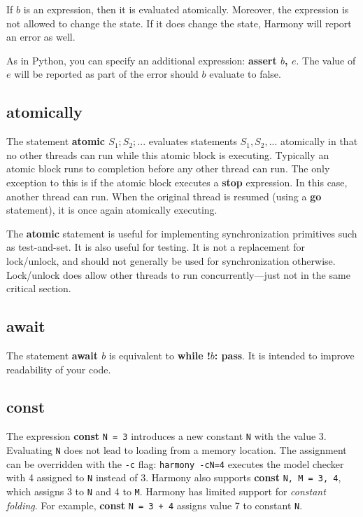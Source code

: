 \documentclass{report}
\begin{document}
If $b$ is an expression, then it is evaluated atomically.
Moreover, the expression is not allowed to change the state.
If it does change the state, Harmony will report an error as well.

As in Python, you can specify an additional expression:
\textbf{assert $b$, $e$}.  The value of $e$ will be reported as part
of the error should $b$ evaluate to false.

\subsection*{\textbf{atomically}}

The statement \textbf{atomic $S_1; S_2; ...$} evaluates statements
$S_1, S_2, ...$ atomically in that no other threads can run while
this atomic block is executing.  Typically an atomic block runs
to completion before any other thread can run.  The only exception
to this is if the atomic block executes a \textbf{stop} expression.
In this case, another thread can run.  When the original thread
is resumed (using a \textbf{go} statement), it is once again
atomically executing.

The \textbf{atomic} statement is useful for implementing synchronization
primitives such as test-and-set.  It is also useful for testing.
It is not a replacement for lock/unlock, and should not generally be used
for synchronization otherwise.  Lock/unlock does allow other
threads to run concurrently---just not in the same critical section.

\subsection*{\textbf{await}}

The statement \textbf{await $b$} is equivalent to \textbf{while !$b$: pass}.
It is intended to improve readability of your code.

\subsection*{\textbf{const}}

The expression \textbf{const} \texttt{N = 3} introduces a new constant
\texttt{N} with the value 3.  Evaluating \texttt{N} does not lead to
loading from a memory location.  The assignment can be overridden with
the \texttt{-c} flag: \texttt{harmony -cN=4} executes the model checker
with 4 assigned to \texttt{N} instead of 3.
Harmony also supports \textbf{const} \texttt{N, M = 3, 4}, which
assigns 3 to \texttt{N} and 4 to \texttt{M}.
Harmony has limited support for \emph{constant folding}.  For example,
\textbf{const} \texttt{N = 3 + 4} assigns value 7 to constant \texttt{N}.
\end{document}
